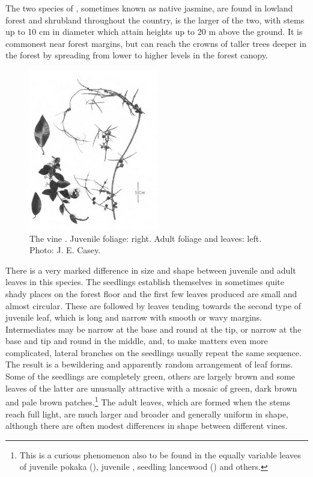 The two species of , sometimes known as native jasmine, are found in lowland forest and shrubland throughout the country,  is the larger of the two, with stems up to 10 cm in diameter which attain heights up to 20 m above the ground.
It is commonest near forest margins, but can reach the crowns of taller trees deeper in the forest by spreading from lower to higher levels in the forest canopy.

\begin{figure}
	\includegraphics[width=0.5\textwidth]{graphics/figure34parsonsia.jpg}
	\centering
	\caption[The vine ]{The vine . Juvenile foliage: right. Adult foliage and leaves: left. Photo: J. E. Casey.}%
	\label{fig:34parsonsia}
\end{figure}

There is a very marked difference in size and shape between juvenile and adult leaves in this species.
The seedlings establish themselves in sometimes quite shady places on the forest floor and the first few leaves produced are small and almost circular.
These are followed by leaves tending towards the second type of juvenile leaf, which is long and narrow with smooth or wavy margins.
Intermediates may be narrow at the base and round at the tip, or narrow at the base and tip and round in the middle, and, to make matters even more complicated, lateral branches on the seedlings usually repeat the same sequence.
The result is a bewildering and apparently random arrangement of leaf forms.
Some of the seedlings are completely green, others are largely brown and some leaves of the latter are unusually attractive with a mosaic of green, dark brown and pale brown patches.\footnote{This is a curious phenomenon also to be found in the equally variable leaves of juvenile pokaka (), juvenile , seedling lancewood () and others.}
The adult leaves, which are formed when the stems reach full light, are much larger and broader and generally uniform in shape, although there are often modest differences in shape between different vines.

